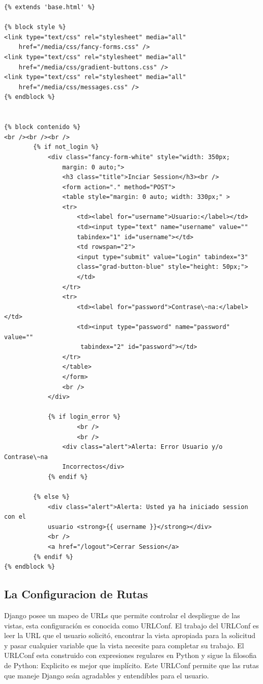 \begin{lstlisting}[style=HTML]
{% extends 'base.html' %}

{% block style %}
<link type="text/css" rel="stylesheet" media="all"
    href="/media/css/fancy-forms.css" />
<link type="text/css" rel="stylesheet" media="all"
    href="/media/css/gradient-buttons.css" />
<link type="text/css" rel="stylesheet" media="all"
    href="/media/css/messages.css" />
{% endblock %}


{% block contenido %}
<br /><br /><br />
        {% if not_login %}
            <div class="fancy-form-white" style="width: 350px;
                margin: 0 auto;">
                <h3 class="title">Inciar Session</h3><br />
                <form action="." method="POST">
                <table style="margin: 0 auto; width: 330px;" >
                <tr>
                    <td><label for="username">Usuario:</label></td>
                    <td><input type="text" name="username" value=""
                    tabindex="1" id="username"></td>
                    <td rowspan="2">
                    <input type="submit" value="Login" tabindex="3"
                    class="grad-button-blue" style="height: 50px;">
                    </td>
                </tr>
                <tr>
                    <td><label for="password">Contrase\~na:</label></td>
                    <td><input type="password" name="password" value=""
                     tabindex="2" id="password"></td>
                </tr>
                </table>
                </form>
                <br />
            </div>

            {% if login_error %}
                    <br />
                    <br />
                <div class="alert">Alerta: Error Usuario y/o Contrase\~na
                Incorrectos</div>
            {% endif %}

        {% else %}
            <div class="alert">Alerta: Usted ya ha iniciado session con el
            usuario <strong>{{ username }}</strong></div>
            <br />
            <a href="/logout">Cerrar Session</a>
        {% endif %}
{% endblock %}
\end{lstlisting}

\vspace{0.1cm}

\subsection{La Configuracion de Rutas}

Django posee un mapeo de URLs que permite controlar el despliegue de las vistas,
esta configuración es conocida como URLConf. El trabajo del URLConf es leer
la URL que el usuario solicitó, encontrar la vista apropiada para la solicitud
y pasar cualquier variable que la vista necesite para completar su trabajo. El
URLConf esta construido con expresiones regulares en Python y sigue la filosofia
de Python: Explicito es mejor que implícito. Este URLConf permite que las rutas
que maneje Django seán agradables y entendibles para el usuario.\\[0.1cm]

